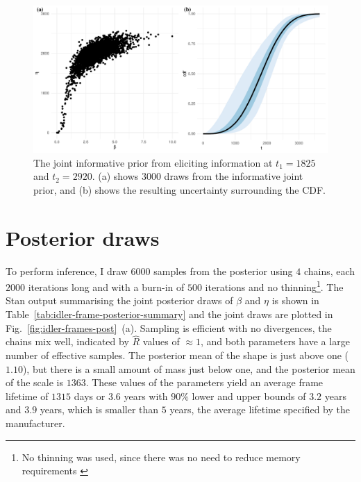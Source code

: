 \begin{figure}[t]
  \centering
  \includegraphics[width=1\textwidth]{./figures/ch-3/idler-frame-prior.pdf}
  \caption{The joint informative prior from eliciting information at $t_1 = 1825$ and $t_2 = 2920$. (a) shows 3000 draws from the informative joint prior, and (b) shows the resulting uncertainty surrounding the CDF.}
  \label{fig:idler-frames-prior}
\end{figure}

\section{Posterior draws} \label{sec:idler-frame-posterior}

To perform inference, I draw $6000$ samples from the posterior using $4$ chains, each $2000$ iterations long and with a burn-in of $500$ iterations and no thinning\footnote{No thinning was used, since there was no need to reduce memory requirements \citep[Sec.~16.4]{Stan2024}}. The Stan output summarising the joint posterior draws of $\beta$ and $\eta$ is shown in Table~\ref{tab:idler-frame-posterior-summary} and the joint draws are plotted in Fig.~\ref{fig:idler-frames-post}~(a). Sampling is efficient with no divergences, the chains mix well, indicated by $\hat{R}$ values of $\approx 1$, and both parameters have a large number of effective samples. The posterior mean of the shape is just above one ($1.10$), but there is a small amount of mass just below one, and the posterior mean of the scale is $1363$. These values of the parameters yield an average frame lifetime of $1315$ days or $3.6$ years with $90\%$ lower and upper bounds of $3.2$ years and $3.9$ years, which is smaller than $5$ years, the average lifetime  specified by the manufacturer.



